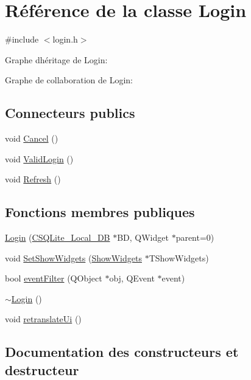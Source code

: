 \hypertarget{class_login}{}\section{Référence de la classe Login}
\label{class_login}


{\ttfamily \#include $<$login.\+h$>$}



Graphe d\textquotesingle{}héritage de Login\+:


Graphe de collaboration de Login\+:
\subsection*{Connecteurs publics}
\begin{DoxyCompactItemize}
\item 
void \hyperlink{class_login_ae0fedd5f1f68645c45492123dd9564d4}{Cancel} ()
\item 
void \hyperlink{class_login_a689bfbbbdbb9d472c9fb35b41d19b414}{Valid\+Login} ()
\item 
void \hyperlink{class_login_a501e9a61a2fd2cad987721544023eac4}{Refresh} ()
\end{DoxyCompactItemize}
\subsection*{Fonctions membres publiques}
\begin{DoxyCompactItemize}
\item 
\hyperlink{class_login_a2bb53ae350b649e1d5025295dd19d5cd}{Login} (\hyperlink{class_c_s_q_lite___local___d_b}{C\+S\+Q\+Lite\+\_\+\+Local\+\_\+\+D\+B} $\ast$B\+D, Q\+Widget $\ast$parent=0)
\item 
void \hyperlink{class_login_af0b8b068258da34b0c098d3a2d0c0448}{Set\+Show\+Widgets} (\hyperlink{class_show_widgets}{Show\+Widgets} $\ast$T\+Show\+Widgets)
\item 
bool \hyperlink{class_login_a1448be42e01f9d2704c7626d9c7e4ce7}{event\+Filter} (Q\+Object $\ast$obj, Q\+Event $\ast$event)
\item 
\hyperlink{class_login_a659bc7233ec12c79b9fa523c1734fbbc}{$\sim$\+Login} ()
\item 
void \hyperlink{class_login_acbeb4dac3fd0df761cce5e4e8b2ecd8f}{retranslate\+Ui} ()
\end{DoxyCompactItemize}


\subsection{Documentation des constructeurs et destructeur}
\hypertarget{class_login_a2bb53ae350b649e1d5025295dd19d5cd}{}

